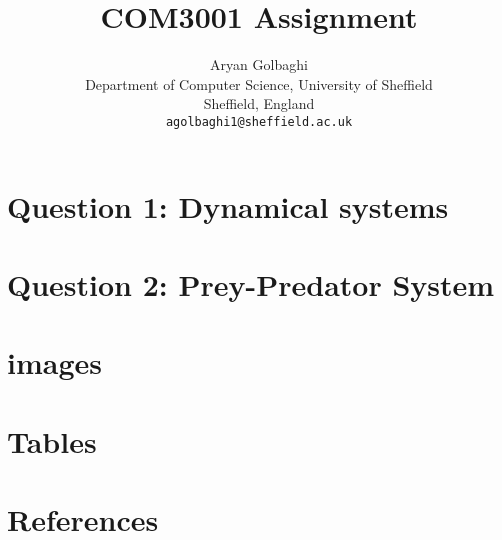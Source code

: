 \documentclass[6pt]{article}
\title{COM3001 Assignment}
\author{Aryan Golbaghi \\
Department of Computer Science, University of Sheffield \\
Sheffield, England \\
\texttt{agolbaghi1@sheffield.ac.uk}}
\begin{document}
\section{Question 1: Dynamical systems}



\section{Question 2: Prey-Predator System}








\newpage
\appendix




\section{images}
\listoffigures



\section{Tables}
\listoftables


\section{References}
 
 
\end{document}
